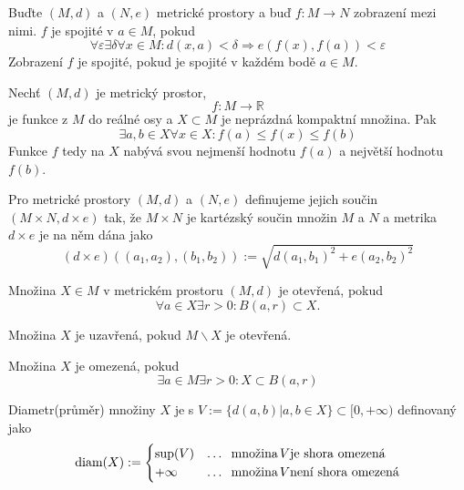 \documentclass[../main.tex]{subfiles}
\begin{document}
\begin{definition}
    Buďte $(M,d)$ a $(N,e)$ metrické prostory a buď $f: M \to N$ zobrazení mezi nimi. $f$ je spojité v
    $a \in M$, pokud
    \[ \forall \varepsilon \exists \delta \forall x \in M: d(x,a) < \delta \Rightarrow e(f(x), f(a)) < \varepsilon \]
    Zobrazení $f$ je spojité, pokud je spojité v každém bodě $a \in M$.
\end{definition}

\begin{theorem}
    Nechť $(M,d)$ je metrický prostor, \[ f: M \to \mathbb{R} \] je funkce z $M$ do reálné osy a
    $X \subset M$ je neprázdná kompaktní množina. Pak
    \[ \exists a,b \in X \forall x \in X: f(a) \leq f(x) \leq f(b) \]
    Funkce $f$ tedy na $X$ nabývá svou nejmenší hodnotu $f(a)$ a největší hodnotu $f(b)$.
\end{theorem}

\begin{definition}
    Pro metrické prostory $(M,d)$ a $(N,e)$ definujeme jejich součin $(M \times N, d \times e)$ tak,
    že $M \times N$ je kartézský součin množin $M$ a $N$ a metrika $d \times e$ je na něm dána jako
    \[ (d \times e)((a_1, a_2), (b_1, b_2)) := \sqrt{d(a_1, b_1)^2 + e(a_2, b_2)^2} \]
\end{definition}

\begin{definition}
    Množina $X \in M$ v metrickém prostoru $(M,d)$ je otevřená, pokud
    \[ \forall a \in X \exists r > 0: B(a,r) \subset X. \]
\end{definition}

\begin{definition}
    \vspace{3mm}
    \noindent
    Množina $X$ je uzavřená, pokud $M \backslash X$ je otevřená.
\end{definition}

\begin{definition}
    \vspace{3mm}
    \noindent
    Množina $X$ je omezená, pokud
    \[ \exists a \in M  \exists r > 0 : X \subset B(a,r) \]
\end{definition}

\begin{definition}[Diametr]
    Diametr(průměr) množiny $X$ je s $V := \{ d(a,b) | a,b \in X \} \subset [0, +\infty)$
    definovaný jako
    \[ \text{diam}(X) := \begin{cases}
        \sup (V) &\dots \hspace{2mm} \text{množina} \hspace{0.5mm} V \text{je shora omezená}\\
        +\infty &\dots \hspace{2mm} \text{množina} \hspace{0.5mm} V \text{není shora omezená}
    \end{cases} \]
\end{definition}
\end{document}
